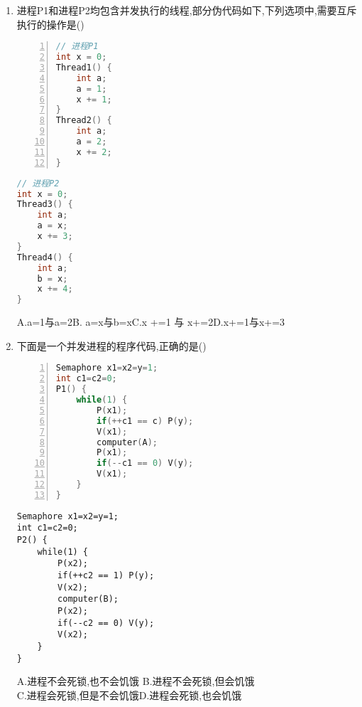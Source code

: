 \documentclass[12pt, a4paper, oneside, UTF8]{ctexbook}
\begin{document}
\begin{enumerate}
    \item 进程P1和进程P2均包含并发执行的线程,部分伪代码如下,下列选项中,需要互斥执行的操作是() 
    \begin{center}
        \begin{minipage}[t]{0.45\textwidth}
\begin{lstlisting}[language=C, numbers=left]
// 进程P1                    
int x = 0;                   
Thread1() {                  
    int a;
    a = 1;
    x += 1;
}
Thread2() {
    int a;
    a = 2;
    x += 2;
}
\end{lstlisting}
        \end{minipage}
        \hfill
        \begin{minipage}[t]{0.45\textwidth}
\begin{lstlisting}[language=C]
// 进程P2                    
int x = 0;                   
Thread3() {                  
    int a;
    a = x;
    x += 3;
}
Thread4() {
    int a;
    b = x;
    x += 4;
}
\end{lstlisting}
        \end{minipage}
    \end{center}

    A.a=1与a=2\qquad B. a=x与b=x\qquad C.x +=1 与 x+=2\qquad D.x+=1与x+=3
    \item 下面是一个并发进程的程序代码,正确的是() 
    \begin{center}
        \begin{minipage}[t]{0.45\textwidth}
            \begin{lstlisting}[language=C, numbers=left]
Semaphore x1=x2=y=1;
int c1=c2=0;
P1() {
    while(1) {
        P(x1);
        if(++c1 == c) P(y);
        V(x1);
        computer(A);
        P(x1);
        if(--c1 == 0) V(y);
        V(x1);
    }
}
                \end{lstlisting}
            \end{minipage}
            \hfil
            \begin{minipage}[t]{0.45\textwidth}
                \begin{lstlisting}
Semaphore x1=x2=y=1;
int c1=c2=0;
P2() {
    while(1) {
        P(x2);
        if(++c2 == 1) P(y);
        V(x2);
        computer(B);
        P(x2);
        if(--c2 == 0) V(y);
        V(x2);
    }
}
            \end{lstlisting}
        \end{minipage}
    \end{center}
A.进程不会死锁,也不会饥饿 \qquad B.进程不会死锁,但会饥饿 \\
C.进程会死锁,但是不会饥饿\qquad D.进程会死锁,也会饥饿 


\end{enumerate}
\end{document}
